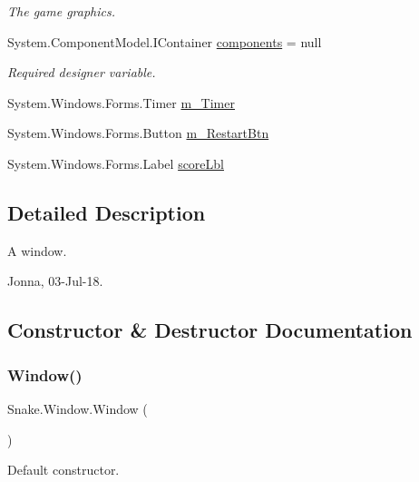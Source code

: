\begin{DoxyCompactItemize}
\begin{DoxyCompactList}\small\item\em The game graphics. \end{DoxyCompactList}\item 
System.\+Component\+Model.\+I\+Container \mbox{\hyperlink{class_snake_1_1_window_aeb5780622794e2bb196f67adfdaa7b55}{components}} = null
\begin{DoxyCompactList}\small\item\em Required designer variable. \end{DoxyCompactList}\item 
System.\+Windows.\+Forms.\+Timer \mbox{\hyperlink{class_snake_1_1_window_ae36d16241edd7f753134d34119b66067}{m\+\_\+\+Timer}}
\item 
System.\+Windows.\+Forms.\+Button \mbox{\hyperlink{class_snake_1_1_window_a38ed1fb52b0f48ca9ee4d472d4b06974}{m\+\_\+\+Restart\+Btn}}
\item 
System.\+Windows.\+Forms.\+Label \mbox{\hyperlink{class_snake_1_1_window_a59d59b9c267f75b0c4b565454f520714}{score\+Lbl}}
\end{DoxyCompactItemize}


\subsection{Detailed Description}
A window. 

Jonna, 03-\/\+Jul-\/18. 

\subsection{Constructor \& Destructor Documentation}
\mbox{\label{class_snake_1_1_window_ab6ea319a57aaf8656b86df24bab0f810}} 
\subsubsection{\texorpdfstring{Window()}{Window()}}
{\footnotesize\ttfamily Snake.\+Window.\+Window (\begin{DoxyParamCaption}{ }\end{DoxyParamCaption})}



Default constructor. 

